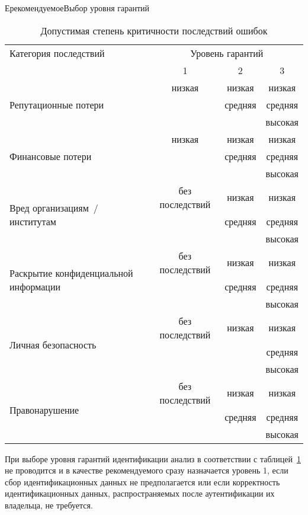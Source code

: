 \begin{appendix}{Е}{рекомендуемое}{Выбор уровня гарантий}
\begin{table}[hbt]
\caption{Допустимая степень критичности последствий ошибок}
\label{Table.AL.Levels}
{\small
\begin{tabular}{|l|c|c|c|}
\hline
Категория последствий & \multicolumn{3}{|c|}{Уровень гарантий}\\
\cline{2-4}
& 1 & 2 & 3\\
\hline
\hline
\multirow{3}{*}{Репутационные потери}
& низкая & низкая  & низкая\\
&       & средняя & средняя\\
&       &         & высокая\\
%
\hline
\multirow{3}{*}{Финансовые потери}
& низкая & низкая  & низкая\\
&        & средняя & средняя\\
&        &         & высокая\\
%
\hline
\multirow{3}{*}{Вред организациям~/ институтам}
& без последствий & низкая  & низкая\\ 
&                 & средняя & средняя\\ 
&                 &         & высокая\\ 
%
\hline
\multirow{3}{*}{Раскрытие конфиденциальной информации}
& без последствий & низкая  & низкая\\ 
&                 & средняя & средняя\\ 
&                 &         & высокая\\ 
%
\hline
\multirow{3}{*}{Личная безопасность}
& без последствий & низкая & низкая\\ 
&                 &        & средняя\\ 
&                 &        & высокая\\ 
%
\hline
\multirow{3}{*}{Правонарушение}
& без последствий & низкая  & низкая\\ 
&                 & средняя & средняя\\ 
&                 &         & высокая\\ 
\hline
\end{tabular}
}
\end{table}

При выборе уровня гарантий идентификации анализ в соответствии с 
таблицей~\ref{Table.AL.Levels} не проводится и в качестве рекомендуемого 
сразу назначается уровень 1, если сбор идентификационных данных не 
предполагается или если корректность идентификационных данных, распространяемых 
после аутентификации их владельца, не требуется.


\end{appendix}
